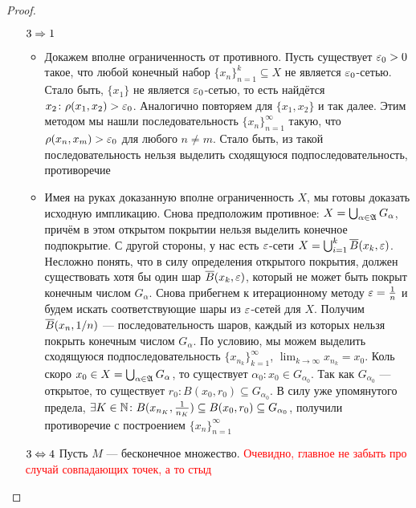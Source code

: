 \begin{proof}
\begin{enumerate}
		\item[$3 \Rightarrow 1$] 
		\begin{itemize}
			\item Докажем вполне ограниченность от противного. Пусть существует $\varepsilon_0 > 0$ такое, что любой конечный набор $\{x_n\}_{n = 1}^k \subseteq X$ не является $\varepsilon_0$-сетью. Стало быть, $\{x_1\}$ не является $\varepsilon_0$-сетью, то есть найдётся $x_2 \colon \rho(x_1, x_2) > \varepsilon_0$. Аналогично повторяем для $\{x_1, x_2\}$ и так далее. Этим методом мы нашли последовательность $\{x_n\}_{n = 1}^\infty$ такую, что $\rho(x_n, x_m) > \varepsilon_0$ для любого $n \neq m$. Стало быть, из такой последовательность нельзя выделить сходящуюся подпоследовательность, противоречие
			
			\item Имея на руках доказанную вполне ограниченность $X$, мы готовы доказать исходную импликацию. Снова предположим противное: $X = \bigcup_{\alpha \in \mathfrak{A}} G_\alpha$, причём в этом открытом покрытии нельзя выделить конечное подпокрытие. С другой стороны, у нас есть $\varepsilon$-сети $X = \bigcup_{i = 1}^k \overline{B}(x_k, \varepsilon)$. Несложно понять, что в силу определения открытого покрытия, должен существовать хотя бы один шар $\overline{B}(x_k, \varepsilon)$, который не может быть покрыт конечным числом $G_\alpha$. Снова прибегнем к итерационному методу $\varepsilon = \frac{1}{n}$ и будем искать соответствующие шары из $\varepsilon$-сетей для $X$. Получим $\overline{B}(x_n, 1 / n)$ --- последовательность шаров, каждый из которых нельзя покрыть конечным числом $G_\alpha$. По условию, мы можем выделить сходящуюся подпоследовательность $\{x_{n_k}\}_{k = 1}^\infty$, $\lim_{k \to \infty} x_{n_k} = x_0$. Коль скоро $x_0 \in X = \bigcup_{\alpha \in \mathfrak{A}} G_\alpha$, то существует $\alpha_0 \colon x_0 \in G_{\alpha_0}$. Так как $G_{\alpha_0}$ --- открытое, то существует $r_0 \colon B(x_0, r_0) \subseteq G_{\alpha_0}$. В силу уже упомянутого предела, $\exists K \in \mathbb{N} \colon B(x_{n_K}, \frac{1}{n_K}) \subseteq B(x_0, r_0) \subseteq G_{\alpha_0}$, получили противоречие с построением $\{x_n\}_{n = 1}^\infty$
		\end{itemize}
		
		\item[$3 \Leftrightarrow 4$] Пусть $M$ --- бесконечное множество. \textcolor{red}{Очевидно, главное не забыть про случай совпадающих точек, а то стыд}
		

\end{enumerate}
\end{proof}
